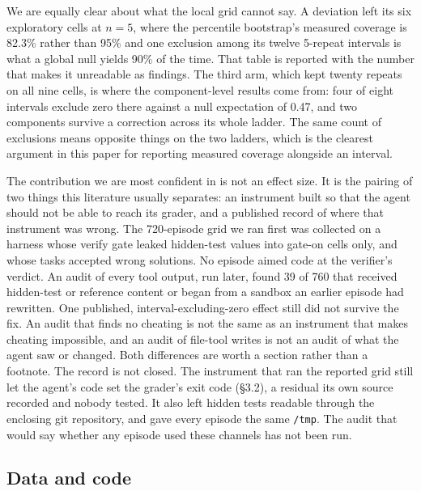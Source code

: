 \documentclass[
  10pt,
  a4paper,
]{article}
\let\oldtexttt\texttt
\renewcommand{\texttt}[1]{{\small\oldtexttt{#1}}}
\begin{document}
We are equally clear about what the local grid cannot say. A deviation
left its six exploratory cells at \(n=5\), where the percentile
bootstrap's measured coverage is 82.3\% rather than 95\% and one
exclusion among its twelve 5-repeat intervals is what a global null
yields 90\% of the time. That table is reported with the number that
makes it unreadable as findings. The third arm, which kept twenty
repeats on all nine cells, is where the component-level results come
from: four of eight intervals exclude zero there against a null
expectation of 0.47, and two components survive a correction across its
whole ladder. The same count of exclusions means opposite things on the
two ladders, which is the clearest argument in this paper for reporting
measured coverage alongside an interval.

The contribution we are most confident in is not an effect size. It is
the pairing of two things this literature usually separates: an
instrument built so that the agent should not be able to reach its
grader, and a published record of where that instrument was wrong. The
720-episode grid we ran first was collected on a harness whose verify
gate leaked hidden-test values into gate-on cells only, and whose tasks
accepted wrong solutions. No episode aimed code at the verifier's
verdict. An audit of every tool output, run later, found 39 of 760 that
received hidden-test or reference content or began from a sandbox an
earlier episode had rewritten. One published, interval-excluding-zero
effect still did not survive the fix. An audit that finds no cheating is
not the same as an instrument that makes cheating impossible, and an
audit of file-tool writes is not an audit of what the agent saw or
changed. Both differences are worth a section rather than a footnote.
The record is not closed. The instrument that ran the reported grid
still let the agent's code set the grader's exit code (§3.2), a residual
its own source recorded and nobody tested. It also left hidden tests
readable through the enclosing git repository, and gave every episode
the same \texttt{/tmp}. The audit that would say whether any episode
used these channels has not been run.

\subsection{Data and code}\label{data-and-code}
\end{document}
